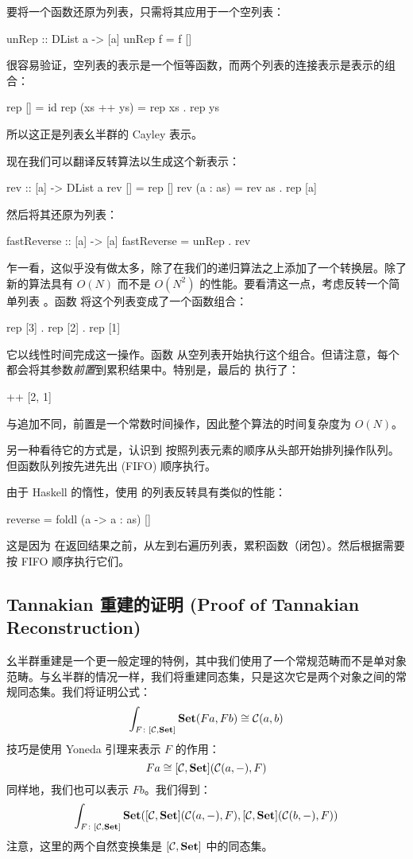 \documentclass[DaoFP]{subfiles}
\begin{document}
 要将一个函数还原为列表，只需将其应用于一个空列表：
 \begin{haskell}
  unRep :: DList a -> [a]
  unRep f = f []
 \end{haskell}
 很容易验证，空列表的表示是一个恒等函数，而两个列表的连接表示是表示的组合：
 \begin{haskell}
  rep [] = id
  rep (xs ++ ys) = rep xs . rep ys
 \end{haskell}
 所以这正是列表幺半群的 Cayley 表示。

 现在我们可以翻译反转算法以生成这个新表示：
 \begin{haskell}
  rev :: [a] -> DList a
  rev [] = rep []
  rev (a : as) = rev as . rep [a]
 \end{haskell}
 然后将其还原为列表：
 \begin{haskell}
  fastReverse :: [a] -> [a]
  fastReverse = unRep . rev
 \end{haskell}
 乍一看，这似乎没有做太多，除了在我们的递归算法之上添加了一个转换层。除了新的算法具有 $O(N)$ 而不是 $O(N^2)$ 的性能。要看清这一点，考虑反转一个简单列表 \hask{[1, 2, 3]}。函数  将这个列表变成了一个函数组合：
 \begin{haskell}
  rep [3] . rep [2] . rep [1]
 \end{haskell}
 它以线性时间完成这一操作。函数  从空列表开始执行这个组合。但请注意，每个  都会将其参数\emph{前置}到累积结果中。特别是，最后的  执行了：
 \begin{haskell}
 [3] ++ [2, 1]
 \end{haskell}
 与追加不同，前置是一个常数时间操作，因此整个算法的时间复杂度为 $O(N)$。

 另一种看待它的方式是，认识到  按照列表元素的顺序从头部开始排列操作队列。但函数队列按先进先出 (FIFO) 顺序执行。

 由于 Haskell 的惰性，使用  的列表反转具有类似的性能：
 \begin{haskell}
  reverse = foldl (\as a -> a : as) []
 \end{haskell}
 这是因为  在返回结果之前，从左到右遍历列表，累积函数（闭包）。然后根据需要按 FIFO 顺序执行它们。

 \subsection{Tannakian 重建的证明 (Proof of Tannakian Reconstruction)}

 幺半群重建是一个更一般定理的特例，其中我们使用了一个常规范畴而不是单对象范畴。与幺半群的情况一样，我们将重建同态集，只是这次它是两个对象之间的常规同态集。我们将证明公式：
 \[ \int_{F \colon [\mathcal{C}, \mathbf{Set}]} \mathbf{Set} (F a, F b) \cong \mathcal{C}(a, b) \]
 技巧是使用 Yoneda 引理来表示 $F$ 的作用：
 \[ F a \cong [\mathcal{C}, \mathbf{Set}] ( \mathcal{C} (a ,-), F) \]
 同样地，我们也可以表示 $F b$。我们得到：
 \[ \int_{F \colon [\mathcal{C}, \mathbf{Set}]} \mathbf{Set} ([\mathcal{C}, \mathbf{Set}] ( \mathcal{C} (a ,-), F), [\mathcal{C}, \mathbf{Set}] ( \mathcal{C} (b ,-), F)) \]
 注意，这里的两个自然变换集是 $[\mathcal{C}, \mathbf{Set}]$ 中的同态集。
\end{document}

